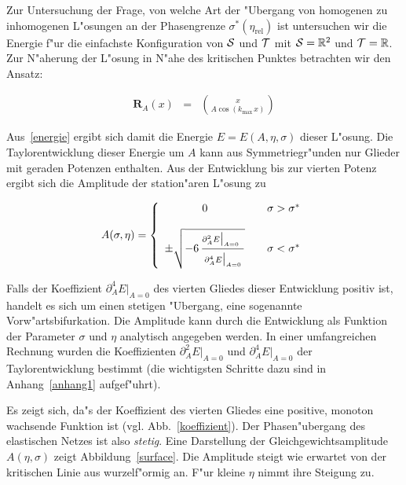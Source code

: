 Zur Untersuchung der Frage, von welche Art der "Ubergang von homogenen zu
inhomogenen L"osungen an der Phasengrenze $\sigma^\ast(\eta_{\text{rel}})$
ist untersuchen wir die Energie f"ur die einfachste Konfiguration von $\cal
S$ und $\cal T$ mit ${\cal S} =\mathbb{R}^2$ und ${\cal T}=\mathbb{R}$. Zur
N"aherung der L"osung in N"ahe des kritischen Punktes betrachten wir den
Ansatz:

\begin{eqnarray}
\mathbf{R}_A(x)&=&{x\choose A\cos(k_{\text{max}}\,x)}
\label{ansatz}
\end{eqnarray}

Aus~\eqref{energie} ergibt sich damit die Energie $E=E(A,\eta,\sigma)$
dieser L"osung.  Die Taylorentwicklung dieser Energie um $A$ kann aus
Symmetriegr"unden nur Glieder mit geraden Potenzen enthalten.  Aus der
Entwicklung bis zur vierten Potenz ergibt sich die Amplitude der
station"aren L"osung zu

\begin{equation}
A(\sigma,\eta)=\left\{\begin{array}{cll}
0&&\sigma>\sigma^\ast\\
&&\\
\pm\sqrt{-6\,\frac{{\vrule width 0pt height 0.30cm}\partial_A^2E\big\vert_{A=0_{\phantom{g}}}}{{\vrule width 0pt height 0.4cm}\partial_A^4E\big\vert_{A=0}}}&&\sigma<\sigma^\ast
\end{array}\right.
\label{ampli}
\end{equation}

Falls der Koeffizient $\partial_A^4E\big\vert_{A=0}$ des vierten Gliedes
dieser Entwicklung positiv ist, handelt es sich um einen stetigen
"Ubergang, eine sogenannte Vorw"artsbifurkation.  Die Amplitude kann durch die
Entwicklung als Funktion der Parameter $\sigma$ und $\eta$ analytisch
angegeben werden.  In einer umfangreichen Rechnung wurden die Koeffizienten
$\partial_A^2E\big\vert_{A=0}$ und $\partial_A^4E\big\vert_{A=0}$ der
Taylorentwicklung bestimmt (die wichtigsten Schritte dazu sind in
Anhang~\ref{anhang1} aufgef"uhrt).

Es zeigt sich, da"s der Koeffizient des vierten Gliedes eine positive,
monoton wachsende Funktion ist (vgl. Abb.~\ref{koeffizient}). Der
Phasen"ubergang des elastischen Netzes ist also \emph{stetig}.  Eine
Darstellung der Gleichgewichtsamplitude $A(\eta,\sigma)$ zeigt
Abbildung~\ref{surface}. Die Amplitude steigt wie erwartet von der
kritischen Linie aus wurzelf"ormig an. F"ur kleine $\eta$ nimmt ihre
Steigung zu.

